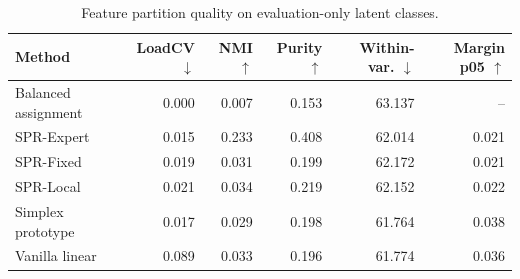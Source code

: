 \begin{table}[t]
\centering
\caption{Feature partition quality on evaluation-only latent classes.}
\label{tab:e4_feature_partition}
\begin{tabular}{lrrrrr}
\toprule
Method & LoadCV $\downarrow$ & NMI $\uparrow$ & Purity $\uparrow$ & Within-var. $\downarrow$ & Margin p05 $\uparrow$ \\
\midrule
Balanced assignment & 0.000 & 0.007 & 0.153 & 63.137 & -- \\
SPR-Expert & 0.015 & 0.233 & 0.408 & 62.014 & 0.021 \\
SPR-Fixed & 0.019 & 0.031 & 0.199 & 62.172 & 0.021 \\
SPR-Local & 0.021 & 0.034 & 0.219 & 62.152 & 0.022 \\
Simplex prototype & 0.017 & 0.029 & 0.198 & 61.764 & 0.038 \\
Vanilla linear & 0.089 & 0.033 & 0.196 & 61.774 & 0.036 \\
\bottomrule
\end{tabular}
\end{table}
